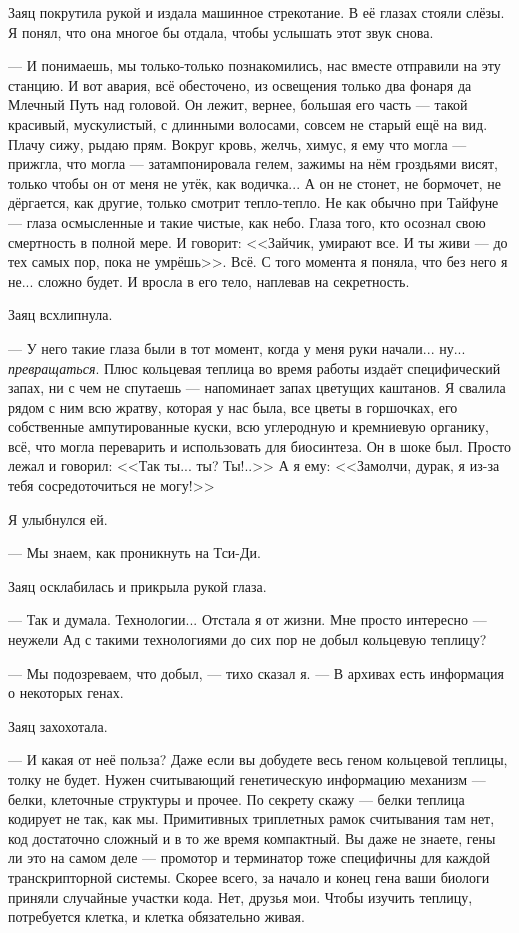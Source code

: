 Заяц покрутила рукой и издала машинное стрекотание.
В её глазах стояли слёзы.
Я понял, что она многое бы отдала, чтобы услышать этот звук снова.

--- И понимаешь, мы только-только познакомились, нас вместе отправили на эту станцию.
И вот авария, всё обесточено, из освещения только два фонаря да Млечный Путь над головой.
Он лежит, вернее, большая его часть --- такой красивый, мускулистый, с длинными волосами, совсем не старый ещё на вид.
Плачу сижу, рыдаю прям.
Вокруг кровь, желчь, химус, я ему что могла --- прижгла, что могла --- затампонировала гелем, зажимы на нём гроздьями висят, только чтобы он от меня не утёк, как водичка...
А он не стонет, не бормочет, не дёргается, как другие, только смотрит тепло-тепло.
Не как обычно при Тайфуне --- глаза осмысленные и такие чистые, как небо.
Глаза того, кто осознал свою смертность в полной мере.
И говорит: <<Зайчик, умирают все.
И ты живи --- до тех самых пор, пока не умрёшь>>.
Всё.
С того момента я поняла, что без него я не... сложно будет.
И вросла в его тело, наплевав на секретность.

Заяц всхлипнула.

--- У него такие глаза были в тот момент, когда у меня руки начали... ну... \emph{превращаться}.
Плюс кольцевая теплица во время работы издаёт специфический запах, ни с чем не спутаешь --- напоминает запах цветущих каштанов.
Я свалила рядом с ним всю жратву, которая у нас была, все цветы в горшочках, его собственные ампутированные куски, всю углеродную и кремниевую органику, всё, что могла переварить и использовать для биосинтеза. %
Он в шоке был.
Просто лежал и говорил: <<Так ты... ты? Ты!..>>
А я ему: <<Замолчи, дурак, я из-за тебя сосредоточиться не могу!>>

Я улыбнулся ей.

--- Мы знаем, как проникнуть на Тси-Ди.

Заяц осклабилась и прикрыла рукой глаза.

--- Так и думала.
Технологии...
Отстала я от жизни.
Мне просто интересно --- неужели Ад с такими технологиями до сих пор не добыл кольцевую теплицу?

--- Мы подозреваем, что добыл, --- тихо сказал я.
--- В архивах есть информация о некоторых генах.

Заяц захохотала.

--- И какая от неё польза?
Даже если вы добудете весь геном кольцевой теплицы, толку не будет.
Нужен считывающий генетическую информацию механизм --- белки, клеточные структуры и прочее.
По секрету скажу --- белки теплица кодирует не так, как мы.
Примитивных триплетных рамок считывания там нет, код достаточно сложный и в то же время компактный.
Вы даже не знаете, гены ли это на самом деле --- промотор и терминатор тоже специфичны для каждой транскрипторной системы.
Скорее всего, за начало и конец гена ваши биологи приняли случайные участки кода.
Нет, друзья мои.
Чтобы изучить теплицу, потребуется клетка, и клетка обязательно живая.

